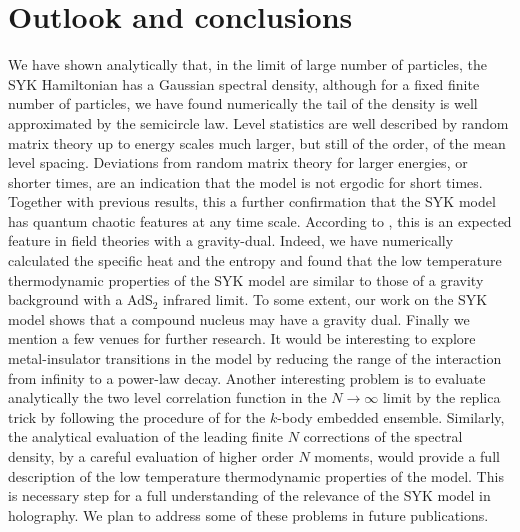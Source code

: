 \documentclass[aps,showpacs,floatfix,superscriptaddress,pre,11pt]{revtex4-1}
\begin{document}
 
\section{Outlook and conclusions}

We have shown analytically that, in the limit of large number of particles,
the SYK Hamiltonian has a Gaussian spectral density, although for a fixed finite number of particles, we have found numerically the tail of the density is well approximated by the semicircle law. Level statistics are well
described by random matrix theory up to energy scales much larger, but still of the order, of
the mean level spacing. Deviations from random matrix theory for larger energies, or shorter
times, are an indication that the model is not ergodic for short times. Together with previous results,
this a further confirmation that the SYK model has quantum chaotic features at any time scale. According to \cite{maldacena2016}, this is an expected feature in field theories with a gravity-dual. Indeed, we have numerically calculated the specific heat and the entropy and
found that the low temperature thermodynamic properties of the
SYK model are similar to those of a gravity background with a AdS$_2$ infrared limit. 
To some extent, our work on the SYK model shows that
a compound nucleus may have a gravity dual.
Finally we mention a few venues for further research. It would be interesting to
explore metal-insulator transitions in the model by reducing the range of the interaction
from infinity to a power-law decay. Another interesting problem is to evaluate analytically
the two level correlation function in the $N \to \infty$ limit by the replica trick by following the procedure of \cite{verbaarschot1984} for the $k$-body embedded ensemble. Similarly, the analytical evaluation
of the leading finite $N$ corrections of the spectral density, by a careful evaluation of higher order $N$ moments, would provide a full description of the low temperature thermodynamic properties of the model. This is necessary step for a full understanding of the relevance of the SYK model in holography. 
We plan to address some of these problems in future publications. 
\end{document}
